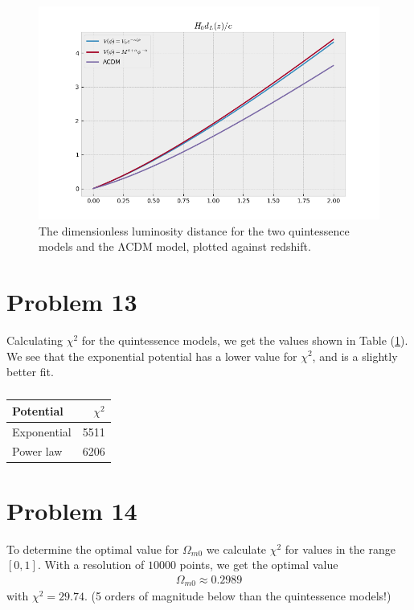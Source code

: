 \documentclass[reprint,english,notitlepage,nofootinbib]{revtex4-1}  %
\numberwithin{equation}{section}
\begin{document}
\begin{figure}[h!]
	\includegraphics[scale=0.4]{lum_distance.png}
	\caption{The dimensionless luminosity distance for the two quintessence models
	 and the ΛCDM model, plotted against redshift.}
	\label{fig:lumdistance}
\end{figure}

\section{Problem 13}
Calculating $\chi^2$ for the quintessence models, we get
the values shown in Table (\ref{tab:chisquare_quintessence}).
We see that the exponential potential has a lower value for $\chi^2$, and is
a slightly better fit.

\begin{table}
	\begin{tabular}{|l|r|}
\hline
 Potential   &   $\chi^2$  \\
\hline
 Exponential & 5511   \\
 Power law   & 6206 \\
\hline
\end{tabular}
	\caption{}
	\label{tab:chisquare_quintessence}
\end{table}

\section{Problem 14}
To determine the optimal value for $\Omega_{m0}$ we
calculate $\chi^2$ for values in the range $[0,1]$.
With a resolution of $10000$ points, we get the optimal
value
\begin{align}
    \Omega_{m0} \approx 0.2989
\end{align}
with $\chi^2 = 29.74$. (5 orders of magnitude below than the quintessence
models!)
\end{document}
